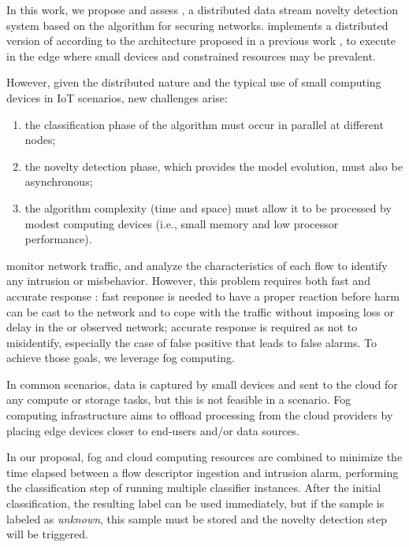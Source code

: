 In this work, we propose and assess \mfog, a distributed data stream
novelty detection system based on the algorithm \minas for securing \iot networks.
\mfog implements a distributed version of \minas according to the \arch
architecture proposed in a previous work \cite{Cassales2019a}, to execute in the
edge where small devices and constrained resources may be prevalent.

However, given the distributed nature and the typical use of small computing
devices in IoT scenarios, new challenges arise:

\begin{enumerate}[label=(\emph{\roman*})]
  \item the classification phase of the algorithm must occur in parallel at
  different nodes;
  \item the novelty detection phase, which provides the model evolution, must
  also be asynchronous;
  \item the algorithm complexity (time and space) must allow it to be processed
  by modest computing devices (i.e., small memory and low processor performance).
\end{enumerate}

\nids 
monitor network traffic, and analyze the characteristics of each flow 
to identify any intrusion or misbehavior.
However, this problem requires both fast and accurate response \cite{DaCosta2019a}:
fast response is needed to have a proper reaction before harm can be cast
to the network and to cope with the traffic without imposing loss or delay
in the \nids or observed network;
accurate response is required as not to misidentify,
especially the case of false positive that leads to false alarms.
To achieve those goals, we leverage fog computing.

In common \iot scenarios, data is captured by small devices and sent to the
cloud for any compute or storage tasks, but this is not feasible in a \nids
scenario.
Fog computing infrastructure aims to offload processing from the cloud
providers by placing edge devices closer to end-users and/or data sources.

In our proposal, fog and cloud computing resources are combined to minimize
the time elapsed between a flow descriptor ingestion and intrusion alarm,
performing the classification step of \minas running multiple
classifier instances.
After the initial classification, the resulting label can be used immediately,
but if the sample is labeled as \emph{unknown}, this sample must be stored and
the novelty detection step will be triggered.

